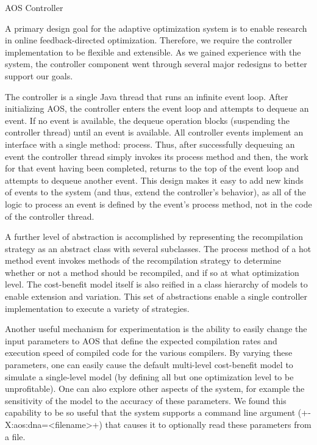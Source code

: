 \begin{section}{AOS Controller}
\label{sec:aoscontroller}

A primary design goal for the adaptive optimization system is to enable research in online feedback-directed optimization. Therefore, we require the controller implementation to be flexible and extensible. As we gained experience with the system, the controller component went through several major redesigns to better support our goals.

The controller is a single Java thread that runs an infinite event loop. After initializing AOS, the controller enters the event loop and attempts to dequeue an event. If no event is available, the dequeue operation blocks (suspending the controller thread) until an event is available. All controller events implement an interface with a single method: process. Thus, after successfully dequeuing an event the controller thread simply invokes its process method and then, the work for that event having been completed, returns to the top of the event loop and attempts to dequeue another event. This design makes it easy to add new kinds of events to the system (and thus, extend the controller's behavior), as all of the logic to process an event is defined by the event's process method, not in the code of the controller thread.

A further level of abstraction is accomplished by representing the recompilation strategy as an abstract class with several subclasses. The process method of a hot method event invokes methods of the recompilation strategy to determine whether or not a method should be recompiled, and if so at what optimization level. The cost-benefit model itself is also reified in a class hierarchy of models to enable extension and variation. This set of abstractions enable a single controller implementation to execute a variety of strategies.

Another useful mechanism for experimentation is the ability to easily change the input parameters to AOS that define the expected compilation rates and execution speed of compiled code for the various compilers. By varying these parameters, one can easily cause the default multi-level cost-benefit model to simulate a single-level model (by defining all but one optimization level to be unprofitable). One can also explore other aspects of the system, for example the sensitivity of the model to the accuracy of these parameters. We found this capability to be so useful that the system supports a command line argument (\spverb+-X:aos:dna=<filename>+) that causes it to optionally read these parameters from a file.

\end{section}
